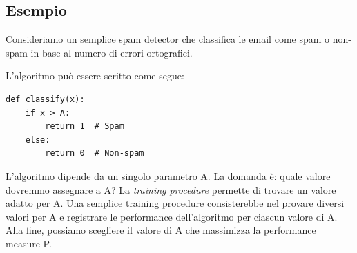 \subsection{Esempio}

Consideriamo un semplice spam detector che classifica le email come spam o non-spam in base al numero di errori ortografici. 

\noindent
L'algoritmo può essere scritto come segue:

\begin{verbatim}
def classify(x):
    if x > A:
        return 1  # Spam
    else:
        return 0  # Non-spam
\end{verbatim}

\noindent
L'algoritmo dipende da un singolo parametro A. La domanda è: quale valore dovremmo assegnare a A? La \emph{training procedure} permette di trovare un valore adatto per A.
\noindent
Una semplice training procedure consisterebbe nel provare diversi valori per A e registrare le performance dell'algoritmo per ciascun valore di A. Alla fine, possiamo scegliere il valore di A che massimizza la performance measure P.
